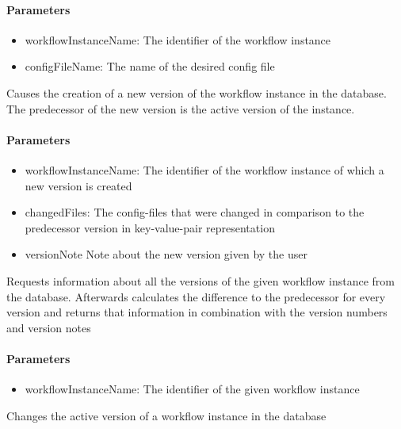 \paragraph{Parameters}
\begin{itemize}
	\item{workflowInstanceName:}
	The identifier of the workflow instance
	\item{configFileName:}
	The name of the desired config file
\end{itemize}

Causes the creation of a new version of the workflow instance in the database. The predecessor of the new version is the active version of the instance.

\paragraph{Parameters}
\begin{itemize}
	\item{workflowInstanceName:}
	The identifier of the workflow instance of which a new version is created
	\item{changedFiles:}
	The config-files that were changed in comparison to the predecessor version in key-value-pair representation
	\item{versionNote}
	Note about the new version given by the user
\end{itemize}

Requests information about all the versions of the given workflow instance from the database. Afterwards calculates the difference to the predecessor for every version and returns that information in combination with the version numbers and version notes

\paragraph{Parameters}
\begin{itemize}
	\item{workflowInstanceName:}
	The identifier of the given workflow instance
\end{itemize}

Changes the active version of a workflow instance in the database


